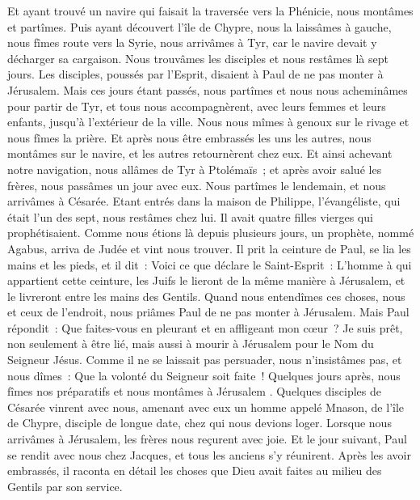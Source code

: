 \begin{multicols}{2}
Et ayant trouvé un navire qui faisait la traversée vers la Phénicie, nous montâmes et partîmes.
Puis ayant découvert l'île de Chypre, nous la laissâmes à gauche, nous fîmes route vers la Syrie, nous arrivâmes à Tyr, car le navire devait y décharger sa cargaison.
Nous trouvâmes les disciples et nous restâmes là sept jours. Les disciples, poussés par l'Esprit, disaient à Paul de ne pas monter à Jérusalem.
Mais ces jours étant passés, nous partîmes et nous nous acheminâmes pour partir de Tyr, et tous nous accompagnèrent, avec leurs femmes et leurs enfants, jusqu'à l'extérieur de la ville. Nous nous mîmes à genoux sur le rivage et nous fîmes la prière.
Et après nous être embrassés les uns les autres, nous montâmes sur le navire, et les autres retournèrent chez eux.
Et ainsi achevant notre navigation, nous allâmes de Tyr à Ptolémaïs~; et après avoir salué les frères, nous passâmes un jour avec eux.
Nous partîmes le lendemain, et nous arrivâmes à Césarée. Etant entrés dans la maison de Philippe, l'évangéliste, qui était l'un des sept, nous restâmes chez lui.
Il avait quatre filles vierges qui prophétisaient.
Comme nous étions là depuis plusieurs jours, un prophète, nommé Agabus, arriva de Judée
et vint nous trouver. Il prit la ceinture de Paul, se lia les mains et les pieds, et il dit~: Voici ce que déclare le Saint-Esprit~: L'homme à qui appartient cette ceinture, les Juifs le lieront de la même manière à Jérusalem, et le livreront entre les mains des Gentils.
Quand nous entendîmes ces choses, nous et ceux de l'endroit, nous priâmes Paul de ne pas monter à Jérusalem.
Mais Paul répondit~: Que faites-vous en pleurant et en affligeant mon cœur~? Je suis prêt, non seulement à être lié, mais aussi à mourir à Jérusalem pour le Nom du Seigneur Jésus.
Comme il ne se laissait pas persuader, nous n'insistâmes pas, et nous dîmes~: Que la volonté du Seigneur soit faite~!
Quelques jours après, nous fîmes nos préparatifs et nous montâmes à Jérusalem .
Quelques disciples de Césarée vinrent avec nous, amenant avec eux un homme appelé Mnason, de l'île de Chypre, disciple de longue date, chez qui nous devions loger.
Lorsque nous arrivâmes à Jérusalem, les frères nous reçurent avec joie.
Et le jour suivant, Paul se rendit avec nous chez Jacques, et tous les anciens s'y réunirent.
Après les avoir embrassés, il raconta en détail les choses que Dieu avait faites au milieu des Gentils par son service.

\end{multicols}
